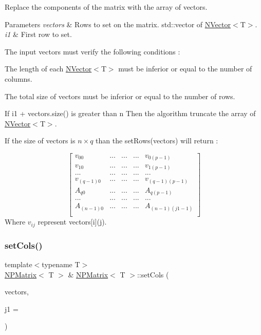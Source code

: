 Replace the components of the matrix with the array of vectors. 


\begin{DoxyParams}{Parameters}
{\em vectors} & Rows to set on the matrix. {\ttfamily std\+::vector} of {\ttfamily \mbox{\hyperlink{class_n_vector}{N\+Vector}}$<$T$>$}.\\
\hline
{\em i1} & First row to set.\\
\hline
\end{DoxyParams}
The input {\ttfamily vectors} must verify the following conditions \+:
\begin{DoxyItemize}
\item The length of each {\ttfamily \mbox{\hyperlink{class_n_vector}{N\+Vector}}$<$T$>$} must be inferior or equal to the number of columns.
\item The total size of vectors must be inferior or equal to the number of rows.
\end{DoxyItemize}

If {\ttfamily i1 + vectors.\+size()} is greater than {\ttfamily n} Then the algorithm truncate the array of {\ttfamily \mbox{\hyperlink{class_n_vector}{N\+Vector}}$<$T$>$}.

If the size of {\ttfamily vectors} is $ n \times q $ than the {\ttfamily set\+Rows(vectors)} will return \+:

\[ \begin{bmatrix} v_{00} & ... & ... & ... & v_{0(p-1)} \\ v_{10} & ... & ... & ... & v_{1(p-1)} \\ ... & ... & ... & ... & ... \\ v_{(q-1)0} & ... & ... & ... & v_{(q-1)(p-1)} \\ A_{q0} & ... & ... & ... & A_{q(p-1)} \\ ... & ... & ... & ... & ... \\ A_{(n-1)0} & ... & ... & ... & A_{(n-1)(j1 - 1)} \\ \end{bmatrix} \] Where $ v_{ij} $ represent {\ttfamily vectors\mbox{[}i\mbox{]}(j)}. \mbox{\label{class_n_p_matrix_a3e3f383b3092d70144e1178da15c5376}} 
\subsubsection{\texorpdfstring{setCols()}{setCols()}}
{\footnotesize\ttfamily template$<$typename T$>$ \\
\mbox{\hyperlink{class_n_p_matrix}{N\+P\+Matrix}}$<$ T $>$ \& \mbox{\hyperlink{class_n_p_matrix}{N\+P\+Matrix}}$<$ T $>$\+::set\+Cols (\begin{DoxyParamCaption}\item[{const std\+::vector$<$ \mbox{\hyperlink{class_n_vector}{N\+Vector}}$<$ T $>$$>$ \&}]{vectors,  }\item[{\mbox{\hyperlink{typedef_8h_a1b140a2034db3f5dfe18a987745df43a}{ul\+\_\+t}}}]{j1 = {} }\end{DoxyParamCaption})}



